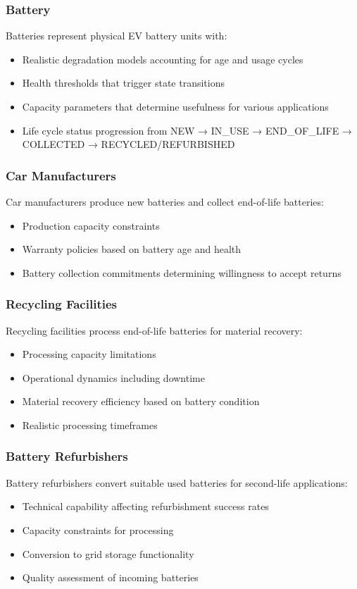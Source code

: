 \subsubsection{Battery}
Batteries represent physical EV battery units with:
\begin{itemize}
    \item Realistic degradation models accounting for age and usage cycles
    \item Health thresholds that trigger state transitions
    \item Capacity parameters that determine usefulness for various applications
    \item Life cycle status progression from NEW → IN\_USE → END\_OF\_LIFE → COLLECTED → RECYCLED/REFURBISHED
\end{itemize}

\subsubsection{Car Manufacturers}
Car manufacturers produce new batteries and collect end-of-life batteries:
\begin{itemize}
    \item Production capacity constraints
    \item Warranty policies based on battery age and health
    \item Battery collection commitments determining willingness to accept returns
\end{itemize}

\subsubsection{Recycling Facilities}
Recycling facilities process end-of-life batteries for material recovery:
\begin{itemize}
    \item Processing capacity limitations
    \item Operational dynamics including downtime
    \item Material recovery efficiency based on battery condition
    \item Realistic processing timeframes
\end{itemize}

\subsubsection{Battery Refurbishers}
Battery refurbishers convert suitable used batteries for second-life applications:
\begin{itemize}
    \item Technical capability affecting refurbishment success rates
    \item Capacity constraints for processing
    \item Conversion to grid storage functionality
    \item Quality assessment of incoming batteries
\end{itemize}

